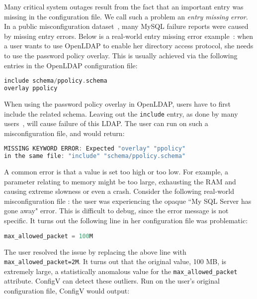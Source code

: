 Many critical system outages result from the fact that an important
entry was missing in the configuration file. 
We call such a problem an {\em entry missing error}.
In a public misconfiguration dataset~\cite{configdataset},
many MySQL failure reports were caused by
missing entry errors.
Below is a real-world entry missing error example~\cite{yin11anempirical}:
when a user wants to use OpenLDAP to enable her directory access
protocol, she needs to use the password policy overlay. This is usually
achieved via the following entries in the OpenLDAP configuration file:

\begin{lstlisting}[language=C, xleftmargin=.01\textwidth]
include schema/ppolicy.schema
overlay ppolicy
\end{lstlisting} 

When using the password policy overlay in OpenLDAP, 
users have to first include the related schema.
Leaving out the {\tt include} entry, 
as done by many users~\cite{yin11anempirical}, 
will cause failure of this LDAP. 
The user can run \app on such a misconfiguration file,
and \app would return:

\begin{lstlisting}[language=C, xleftmargin=.01\textwidth]
MISSING KEYWORD ERROR: Expected "overlay" "ppolicy"
in the same file: "include" "schema/ppolicy.schema"
\end{lstlisting} 

A common error is that a value is set too high or too low.
For example, a parameter relating to memory might be too large,
exhausting the RAM and causing extreme slowness or even a crash. 
Consider the following real-world misconfiguration file \cite{singleValue}: the
user was experiencing the opaque ``My SQL Server has gone away" error.  
This is difficult to debug, since the error message is not specific.
It turns out the following line in her configuration file was problematic:

\begin{lstlisting}[language=C, xleftmargin=.01\textwidth]
max_allowed_packet = 100M
\end{lstlisting} 

The user resolved the issue by replacing the above line with {\tt max\_allowed\_packet=2M}. 
It turns out that the original value, 100 MB, is extremely large, a  
statistically anomalous value for the {\tt max\_allowed\_packet} attribute. ConfigV can detect these
outliers. Run on the user's original configuration file, ConfigV would output:

